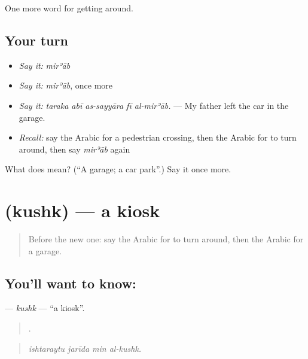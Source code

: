 \begin{grammarlens}[title={What you've built}]
One more word for getting around.
\end{grammarlens}

\subsection*{Your turn}
\begin{itemize}
\raggedright
  \item \emph{Say it:} \emph{mirʾāb}
  \item \emph{Say it:} \emph{mirʾāb}, once more
  \item \emph{Say it:} \emph{taraka abī as-sayyāra fī al-mirʾāb.} — My father left the car in the garage.
  \item \emph{Recall:} say the Arabic for a pedestrian crossing, then the Arabic for to turn around, then say \emph{mirʾāb} again
\end{itemize}

\begin{tcolorbox}[breakable,colback=teal!4,colframe=teal!35!black,title={Before you move on}]
What does  mean? (\textquotedblleft{}A garage; a car park\textquotedblright{}.) Say it once more.
\end{tcolorbox}
\section[\texorpdfstring{\ar{كشك} (kushk)}{كشك (kushk)}]{ (kushk) — a kiosk}

\label{lesson:AR-C436-kushk}



\begin{quote}
Before the new one: say the Arabic for to turn around, then the Arabic for a garage.
\end{quote}

\subsection*{You'll want to know: }
\textbf{} — \emph{kushk} — \textquotedblleft{}a kiosk\textquotedblright{}.

\begin{quote}
   .
\end{quote}

\begin{quote}
\emph{ishtaraytu jarīda min al-kushk.}
\end{quote}

